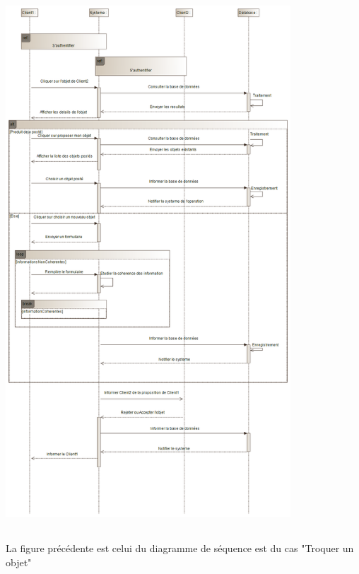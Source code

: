 \documentclass[12pt]{report}
\begin{document}
			\begin{center}
			
				\includegraphics[scale=1, width=0.8\textwidth, height=20cm]{troc6}
			
				\label{troc6}
			\end{center}
		La figure précédente est celui du diagramme de séquence est du cas "Troquer un objet"
		
		\vspace{2em}
			
\end{document}
